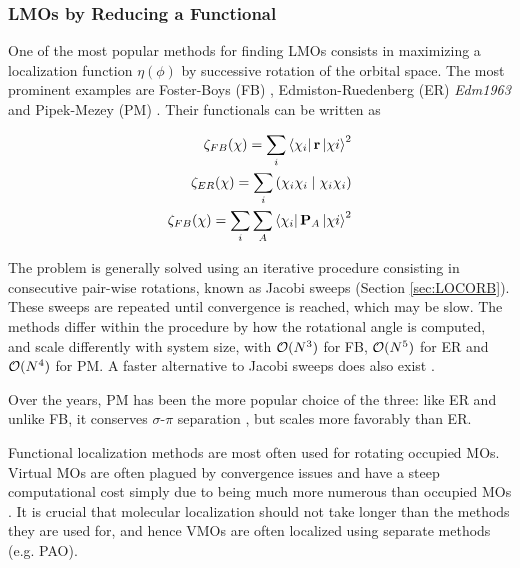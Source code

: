 \subsubsection{LMOs by Reducing a Functional}

One of the most popular methods for finding LMOs consists in maximizing a localization function $\eta(\phi)$ by successive rotation of the orbital space. The most prominent examples are Foster-Boys (FB) \cite{Boy1960}, Edmiston-Ruedenberg (ER) \emph{Edm1963} and Pipek-Mezey (PM) \cite{Pip1989}. Their functionals can be written as

\begin{eqnarray}
\zeta_{FB}(\chi) = \sum_i \bra{\chi_i} \mathbf{r} \ket{\chi i}^2 \\
\zeta_{ER}(\chi) = \sum_i \left( \chi_i \chi_i \mid \chi_i \chi_i \right) \\
\zeta_{FB}(\chi) = \sum_i \sum_A \bra{\chi_i} \mathbf{P}_A \ket{\chi i}^2 
\end{eqnarray}

The problem is generally solved using an iterative procedure consisting in consecutive pair-wise rotations, known as Jacobi sweeps (Section \ref{sec:LOCORB}). These sweeps are repeated until convergence is reached, which may be slow. The methods differ within the procedure by how the rotational angle is computed, and scale differently with system size, with $\mathcal{O}(N^{3})$ for FB, $\mathcal{O}(N^{5})$ for ER and $\mathcal{O}(N^{4})$ for PM. A faster alternative to Jacobi sweeps does also exist \cite{Sub2004}. 

Over the years, PM has been the more popular choice of the three: like ER and unlike FB, it conserves $\sigma$-$\pi$ separation \cite{Aqu2006}, but scales more favorably than ER.

Functional localization methods are most often used for rotating occupied MOs. Virtual MOs are often plagued by convergence issues and have a steep computational cost simply due to being much more numerous than occupied MOs \cite{Sub2005}. It is crucial that molecular localization should not take longer than the methods they are used for, and hence VMOs are often localized using separate methods (e.g. PAO).

